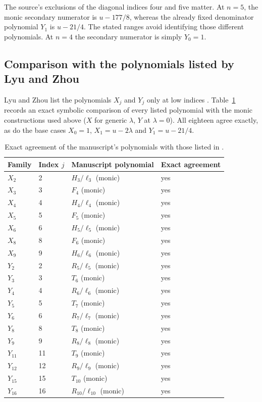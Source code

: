 \documentclass[11pt]{article}
\numberwithin{equation}{section}
\theoremstyle{remark}
\begin{document}
The source's exclusions of the diagonal indices four and five matter.
At $n=5$, the monic secondary numerator is $u-177/8$, whereas the
already fixed denominator polynomial $Y_1$ is $u-21/4$.
The stated ranges avoid identifying those different polynomials.
At $n=4$ the secondary numerator is simply $Y_0=1$.

\subsection{Comparison with the polynomials listed by Lyu and Zhou}
Lyu and Zhou list the polynomials $X_j$ and $Y_j$ only at low indices
\cite[Appendix~C]{LyuZhou2026}. Table~\ref{tab:LZ} records an exact
symbolic comparison of every listed polynomial with the monic
constructions used above ($X$ for generic $\lambda$, $Y$ at $\lambda=0$).
All eighteen agree exactly, as do the base cases $X_0=1$,
$X_1=u-2\lambda$ and $Y_1=u-21/4$.

\begin{table}[ht]
\centering
\begin{tabular}{llll}
\hline
Family & Index $j$ & Manuscript polynomial & Exact agreement\\
\hline
$X_{2}$ & 2 & $H_{3}/\ell_{3}$ (monic) & yes\\
$X_{3}$ & 3 & $F_{4}$ (monic) & yes\\
$X_{4}$ & 4 & $H_{4}/\ell_{4}$ (monic) & yes\\
$X_{5}$ & 5 & $F_{5}$ (monic) & yes\\
$X_{6}$ & 6 & $H_{5}/\ell_{5}$ (monic) & yes\\
$X_{8}$ & 8 & $F_{6}$ (monic) & yes\\
$X_{9}$ & 9 & $H_{6}/\ell_{6}$ (monic) & yes\\
$Y_{2}$ & 2 & $R_{5}/\ell_{5}$ (monic) & yes\\
$Y_{3}$ & 3 & $T_{6}$ (monic) & yes\\
$Y_{4}$ & 4 & $R_{6}/\ell_{6}$ (monic) & yes\\
$Y_{5}$ & 5 & $T_{7}$ (monic) & yes\\
$Y_{6}$ & 6 & $R_{7}/\ell_{7}$ (monic) & yes\\
$Y_{8}$ & 8 & $T_{8}$ (monic) & yes\\
$Y_{9}$ & 9 & $R_{8}/\ell_{8}$ (monic) & yes\\
$Y_{11}$ & 11 & $T_{9}$ (monic) & yes\\
$Y_{12}$ & 12 & $R_{9}/\ell_{9}$ (monic) & yes\\
$Y_{15}$ & 15 & $T_{10}$ (monic) & yes\\
$Y_{16}$ & 16 & $R_{10}/\ell_{10}$ (monic) & yes\\
\hline
\end{tabular}
\caption{Exact agreement of the manuscript's polynomials with those listed in \cite[Appendix~C]{LyuZhou2026}.}\label{tab:LZ}
\end{table}
\end{document}

